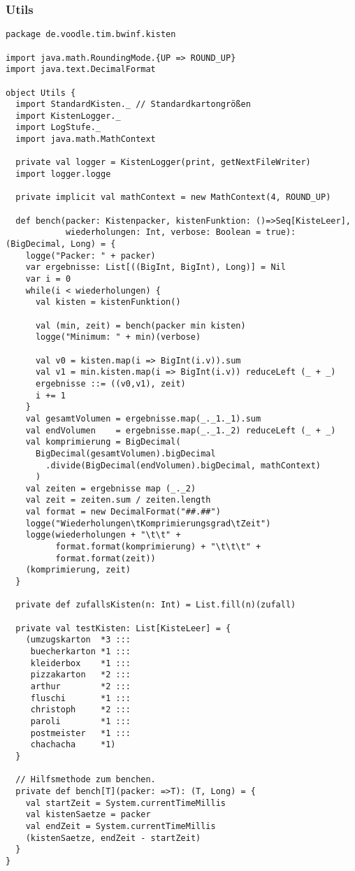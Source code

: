 \subsubsection{Utils}
\begin{lstlisting}
package de.voodle.tim.bwinf.kisten

import java.math.RoundingMode.{UP => ROUND_UP}
import java.text.DecimalFormat

object Utils {
  import StandardKisten._ // Standardkartongrößen
  import KistenLogger._
  import LogStufe._
  import java.math.MathContext

  private val logger = KistenLogger(print, getNextFileWriter)
  import logger.logge

  private implicit val mathContext = new MathContext(4, ROUND_UP)

  def bench(packer: Kistenpacker, kistenFunktion: ()=>Seq[KisteLeer],
            wiederholungen: Int, verbose: Boolean = true): (BigDecimal, Long) = {
    logge("Packer: " + packer)
    var ergebnisse: List[((BigInt, BigInt), Long)] = Nil
    var i = 0
    while(i < wiederholungen) {
      val kisten = kistenFunktion()

      val (min, zeit) = bench(packer min kisten)
      logge("Minimum: " + min)(verbose)

      val v0 = kisten.map(i => BigInt(i.v)).sum
      val v1 = min.kisten.map(i => BigInt(i.v)) reduceLeft (_ + _)
      ergebnisse ::= ((v0,v1), zeit)
      i += 1
    }
    val gesamtVolumen = ergebnisse.map(_._1._1).sum
    val endVolumen    = ergebnisse.map(_._1._2) reduceLeft (_ + _)
    val komprimierung = BigDecimal(
      BigDecimal(gesamtVolumen).bigDecimal
        .divide(BigDecimal(endVolumen).bigDecimal, mathContext)
      )
    val zeiten = ergebnisse map (_._2)
    val zeit = zeiten.sum / zeiten.length
    val format = new DecimalFormat("##.##")
    logge("Wiederholungen\tKomprimierungsgrad\tZeit")
    logge(wiederholungen + "\t\t" +
          format.format(komprimierung) + "\t\t\t" +
          format.format(zeit))
    (komprimierung, zeit)
  }

  private def zufallsKisten(n: Int) = List.fill(n)(zufall)

  private val testKisten: List[KisteLeer] = {
    (umzugskarton  *3 :::
     buecherkarton *1 :::
     kleiderbox    *1 :::
     pizzakarton   *2 :::
     arthur        *2 :::
     fluschi       *1 :::
     christoph     *2 :::
     paroli        *1 :::
     postmeister   *1 :::
     chachacha     *1)
  }

  // Hilfsmethode zum benchen.
  private def bench[T](packer: =>T): (T, Long) = {
    val startZeit = System.currentTimeMillis
    val kistenSaetze = packer
    val endZeit = System.currentTimeMillis
    (kistenSaetze, endZeit - startZeit)
  }
}
\end{lstlisting}
